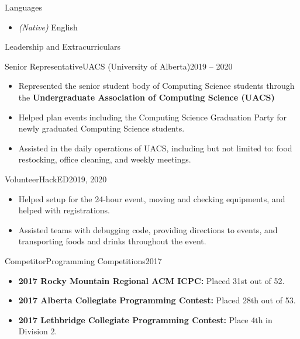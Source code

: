 \documentclass[]{mcdowellcv}
\begin{document}
\vspace*{-10pt}
\begin{cvsection}{Languages}
  \begin{cvsubsection}{}{}{}	
    \begin{itemize}
      \item \emph{(Native)} English  
    \end{itemize}
  \end{cvsubsection}
\end{cvsection}
\newpage
\vspace*{-10pt}
\begin{cvsection}{Leadership and Extracurriculars}{}{}
  \begin{cvsubsection}{Senior Representative}{UACS (University of Alberta)}{2019 -- 2020}
    \begin{itemize}
      \item Represented the senior student body of Computing Science students through the \textbf{Undergraduate Association of Computing Science (UACS)}
      \item Helped plan events including the Computing Science Graduation Party for newly graduated Computing Science students.
      \item Assisted in the daily operations of UACS, including but not limited to: food restocking, office cleaning, and weekly meetings.        
    \end{itemize}
  \end{cvsubsection}

  \begin{cvsubsection}{Volunteer}{HackED}{2019, 2020}
    \begin{itemize}
      \item Helped setup for the 24-hour event, moving and checking equipments, and helped with registrations.
      \item Assisted teams with debugging code, providing directions to events, and transporting foods and drinks throughout the event.    
    \end{itemize}
  \end{cvsubsection}
  
  \begin{cvsubsection}{Competitor}{Programming Competitions}{2017}
    \begin{itemize}
      \item \textbf{2017 Rocky Mountain Regional ACM ICPC:} Placed 31st out of 52.
      \item \textbf{2017 Alberta Collegiate Programming Contest:} Placed 28th out of 53.
      \item \textbf{2017 Lethbridge Collegiate Programming Contest:} Place 4th in Division 2.
    \end{itemize}
  \end{cvsubsection}
\end{cvsection}
\end{document}
